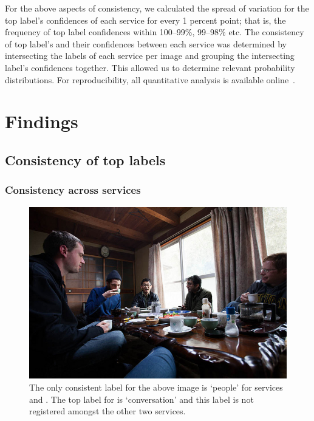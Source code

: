 For the above aspects of consistency, we calculated the spread of variation for the top label's confidences of each service for every 1 percent point; that is, the frequency of top label confidences within 100--99\%, 99--98\% etc. The consistency of top label's and their confidences between each service was determined by intersecting the labels of each service per image and grouping the intersecting label's confidences together. This allowed us to determine relevant probability distributions. For reproducibility, all quantitative analysis is available online~. 

\section{Findings}
\label{icsme2019:sec:findings}

\subsection{Consistency of top labels}
\label{icsme2019:ssec:findings:consistency-of-labels}

\subsubsection{Consistency across services}

\begin{figure}[t]
  \centering
  \includegraphics[width=0.5\linewidth]{000000009590}    
  \caption[Consistency of labels in computer vision services is rare]{The only consistent label for the above image is `people' for services \awsapi{} and \azureapi{}. The top label for \googleapi{} is `conversation' and this label is not registered amongst the other two services.}
  \label{icsme2019:fig:sample-images:people}
\end{figure}

